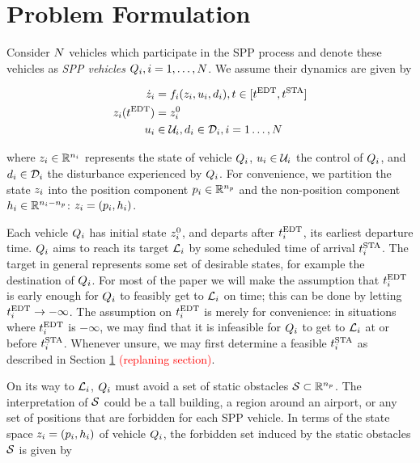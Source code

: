 \section{Problem Formulation \label{sec:formulation}}
Consider $N$ vehicles which participate in the SPP process and denote these vehicles as \textit{SPP vehicles} $Q_{i}, i = 1, \ldots, N$. We assume their dynamics are given by

\begin{equation}
\label{eq:dyn}
\begin{aligned}
\dot\state_i &= \fdyn_i(\state_i, \ctrl_i, \dstb_i), t \in [\edt, \sta] \\
\state_i(\edt) &= \state^0_i \\
\ctrl_i &\in \cset_i, \dstb_i \in \dset_i, i = 1 \ldots, \N
\end{aligned}
\end{equation}

\noindent where $z_i \in \mathbb{R}^{n_i}$ represents the state of vehicle $Q_{i}$, $u_i \in \mathcal{U}_i$ the control of $Q_{i}$, and $d_i \in \mathcal{D}_i$ the disturbance experienced by $Q_{i}$. For convenience, we partition the state $z_i$ into the position component $p_i \in \mathbb{R}^{n_p}$ and the non-position component $h_i \in \mathbb{R}^{n_i - n_p}$: $z_i = (p_i, h_i)$.

Each vehicle $Q_{i}$ has initial state $z^0_i$, and departs after $t^\text{EDT}_i$, its earliest departure time. $Q_{i}$ aims to reach its target $\mathcal{L}_i$ by some scheduled time of arrival $t^\text{STA}_i$. The target in general represents some set of desirable states, for example the destination of $Q_{i}$. For most of the paper we will make the assumption that $t^\text{EDT}_i$ is early enough for $Q_{i}$ to feasibly get to $\mathcal{L}_i$ on time; this can be done by letting $t^\text{EDT}_i \rightarrow -\infty$. The assumption on $t^\text{EDT}_i$ is merely for convenience: in situations where $t^\text{EDT}_i$ is $-\infty$, we may find that it is infeasible for $Q_{i}$ to get to $\mathcal{L}_i$ at or before $t^\text{STA}_i$. Whenever unsure, we may first determine a feasible $t^\text{STA}_i$ as described in Section \ref{} \textcolor{red}{(replaning section)}. 

On its way to $\mathcal{L}_i$, $Q_{i}$ must avoid a set of static obstacles $\mathcal{S} \subset \mathbb{R}^{n_p}$. The interpretation of $\mathcal{S}$ could be a tall building, a region around an airport, or any set of positions that are forbidden for each SPP vehicle. In terms of the state space $z_i = (p_i, h_i)$ of vehicle $Q_{i}$, the forbidden set induced by the static obstacles $\mathcal{S}$ is given by

